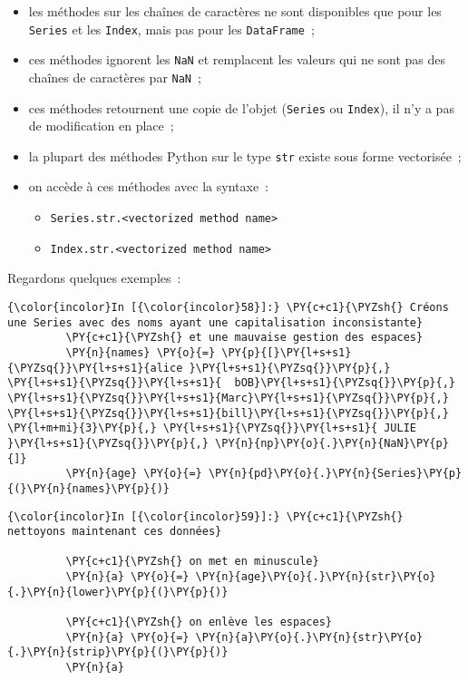 \begin{itemize}
\tightlist
\item
  les méthodes sur les chaînes de caractères ne sont disponibles que
  pour les \texttt{Series} et les \texttt{Index}, mais pas pour les
  \texttt{DataFrame}~;
\item
  ces méthodes ignorent les \texttt{NaN} et remplacent les valeurs qui
  ne sont pas des chaînes de caractères par \texttt{NaN}~;
\item
  ces méthodes retournent une copie de l'objet (\texttt{Series} ou
  \texttt{Index}), il n'y a pas de modification en place~;
\item
  la plupart des méthodes Python sur le type \texttt{str} existe sous
  forme vectorisée~;
\item
  on accède à ces méthodes avec la syntaxe~:

  \begin{itemize}
  \tightlist
  \item
    \texttt{Series.str.\textless{}vectorized\ method\ name\textgreater{}}
  \item
    \texttt{Index.str.\textless{}vectorized\ method\ name\textgreater{}}
  \end{itemize}
\end{itemize}

Regardons quelques exemples~:

    \begin{Verbatim}[commandchars=\\\{\}]
{\color{incolor}In [{\color{incolor}58}]:} \PY{c+c1}{\PYZsh{} Créons une Series avec des noms ayant une capitalisation inconsistante}
         \PY{c+c1}{\PYZsh{} et une mauvaise gestion des espaces}
         \PY{n}{names} \PY{o}{=} \PY{p}{[}\PY{l+s+s1}{\PYZsq{}}\PY{l+s+s1}{alice }\PY{l+s+s1}{\PYZsq{}}\PY{p}{,} \PY{l+s+s1}{\PYZsq{}}\PY{l+s+s1}{  bOB}\PY{l+s+s1}{\PYZsq{}}\PY{p}{,} \PY{l+s+s1}{\PYZsq{}}\PY{l+s+s1}{Marc}\PY{l+s+s1}{\PYZsq{}}\PY{p}{,} \PY{l+s+s1}{\PYZsq{}}\PY{l+s+s1}{bill}\PY{l+s+s1}{\PYZsq{}}\PY{p}{,} \PY{l+m+mi}{3}\PY{p}{,} \PY{l+s+s1}{\PYZsq{}}\PY{l+s+s1}{ JULIE }\PY{l+s+s1}{\PYZsq{}}\PY{p}{,} \PY{n}{np}\PY{o}{.}\PY{n}{NaN}\PY{p}{]}
         \PY{n}{age} \PY{o}{=} \PY{n}{pd}\PY{o}{.}\PY{n}{Series}\PY{p}{(}\PY{n}{names}\PY{p}{)}
\end{Verbatim}


    \begin{Verbatim}[commandchars=\\\{\}]
{\color{incolor}In [{\color{incolor}59}]:} \PY{c+c1}{\PYZsh{} nettoyons maintenant ces données}
         
         \PY{c+c1}{\PYZsh{} on met en minuscule}
         \PY{n}{a} \PY{o}{=} \PY{n}{age}\PY{o}{.}\PY{n}{str}\PY{o}{.}\PY{n}{lower}\PY{p}{(}\PY{p}{)}
         
         \PY{c+c1}{\PYZsh{} on enlève les espaces}
         \PY{n}{a} \PY{o}{=} \PY{n}{a}\PY{o}{.}\PY{n}{str}\PY{o}{.}\PY{n}{strip}\PY{p}{(}\PY{p}{)}
         \PY{n}{a}
\end{Verbatim}


